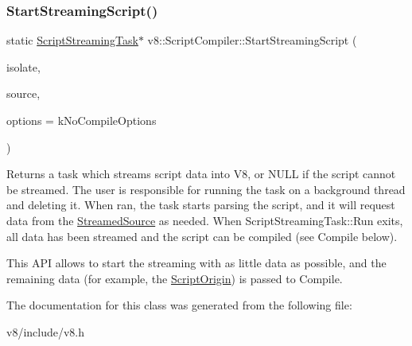 \subsubsection{\texorpdfstring{Start\+Streaming\+Script()}{StartStreamingScript()}}
{\footnotesize\ttfamily static \mbox{\hyperlink{classv8_1_1ScriptCompiler_1_1ScriptStreamingTask}{Script\+Streaming\+Task}}$\ast$ v8\+::\+Script\+Compiler\+::\+Start\+Streaming\+Script (\begin{DoxyParamCaption}\item[{Isolate $\ast$}]{isolate,  }\item[{\mbox{\hyperlink{classv8_1_1ScriptCompiler_1_1StreamedSource}{Streamed\+Source}} $\ast$}]{source,  }\item[{Compile\+Options}]{options = {\ttfamily kNoCompileOptions} }\end{DoxyParamCaption})\hspace{0.3cm}{\ttfamily [static]}}

Returns a task which streams script data into V8, or N\+U\+LL if the script cannot be streamed. The user is responsible for running the task on a background thread and deleting it. When ran, the task starts parsing the script, and it will request data from the \mbox{\hyperlink{classv8_1_1ScriptCompiler_1_1StreamedSource}{Streamed\+Source}} as needed. When Script\+Streaming\+Task\+::\+Run exits, all data has been streamed and the script can be compiled (see Compile below).

This A\+PI allows to start the streaming with as little data as possible, and the remaining data (for example, the \mbox{\hyperlink{classv8_1_1ScriptOrigin}{Script\+Origin}}) is passed to Compile. 

The documentation for this class was generated from the following file\+:\begin{DoxyCompactItemize}
\item 
v8/include/v8.\+h\end{DoxyCompactItemize}

